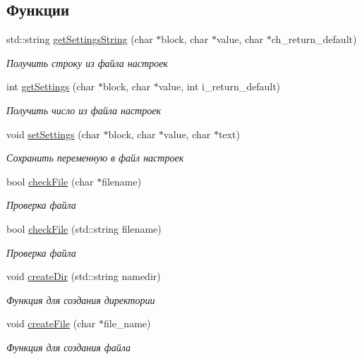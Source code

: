 \subsection*{Функции}
\begin{DoxyCompactItemize}
\item 
std\+::string \mbox{\hyperlink{group__settingsh_ga3a0f1e87eb01bdd16c4a7e365aa283eb}{get\+Settings\+String}} (char $\ast$block, char $\ast$value, char $\ast$ch\+\_\+return\+\_\+default)
\begin{DoxyCompactList}\small\item\em Получить строку из файла настроек \end{DoxyCompactList}\item 
int \mbox{\hyperlink{group__settingsh_ga0a2fe94de4037eda33c49fe332970891}{get\+Settings}} (char $\ast$block, char $\ast$value, int i\+\_\+return\+\_\+default)
\begin{DoxyCompactList}\small\item\em Получить число из файла настроек \end{DoxyCompactList}\item 
void \mbox{\hyperlink{group__settingsh_ga463e32ccb37f9478b0e62ee0d21c5999}{set\+Settings}} (char $\ast$block, char $\ast$value, char $\ast$text)
\begin{DoxyCompactList}\small\item\em Сохранить переменную в файл настроек \end{DoxyCompactList}\item 
bool \mbox{\hyperlink{group__settingsh_ga2dd1bc039652a0480c444957d416b6a6}{check\+File}} (char $\ast$filename)
\begin{DoxyCompactList}\small\item\em Проверка файла \end{DoxyCompactList}\item 
bool \mbox{\hyperlink{group__settingsh_ga147bed619c6314e960320c1bcb40ed91}{check\+File}} (std\+::string filename)
\begin{DoxyCompactList}\small\item\em Проверка файла \end{DoxyCompactList}\item 
void \mbox{\hyperlink{group__settingsh_ga912b67f6f6b05abadd055a379dd84864}{create\+Dir}} (std\+::string namedir)
\begin{DoxyCompactList}\small\item\em Функция для создания директории \end{DoxyCompactList}\item 
void \mbox{\hyperlink{group__settingsh_ga8f34a2030acfb5567678ab2bba25f3c1}{create\+File}} (char $\ast$file\+\_\+name)
\begin{DoxyCompactList}\small\item\em Функция для создания файла \end{DoxyCompactList}\end{DoxyCompactItemize}


